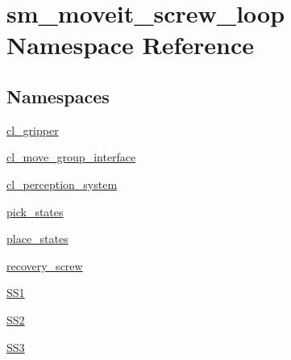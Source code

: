 \hypertarget{namespacesm__moveit__screw__loop}{}\section{sm\+\_\+moveit\+\_\+screw\+\_\+loop Namespace Reference}
\label{namespacesm__moveit__screw__loop}
\subsection*{Namespaces}
\begin{DoxyCompactItemize}
\item 
 \hyperlink{namespacesm__moveit__screw__loop_1_1cl__gripper}{cl\+\_\+gripper}
\item 
 \hyperlink{namespacesm__moveit__screw__loop_1_1cl__move__group__interface}{cl\+\_\+move\+\_\+group\+\_\+interface}
\item 
 \hyperlink{namespacesm__moveit__screw__loop_1_1cl__perception__system}{cl\+\_\+perception\+\_\+system}
\item 
 \hyperlink{namespacesm__moveit__screw__loop_1_1pick__states}{pick\+\_\+states}
\item 
 \hyperlink{namespacesm__moveit__screw__loop_1_1place__states}{place\+\_\+states}
\item 
 \hyperlink{namespacesm__moveit__screw__loop_1_1recovery__screw}{recovery\+\_\+screw}
\item 
 \hyperlink{namespacesm__moveit__screw__loop_1_1SS1}{S\+S1}
\item 
 \hyperlink{namespacesm__moveit__screw__loop_1_1SS2}{S\+S2}
\item 
 \hyperlink{namespacesm__moveit__screw__loop_1_1SS3}{S\+S3}
\end{DoxyCompactItemize}
